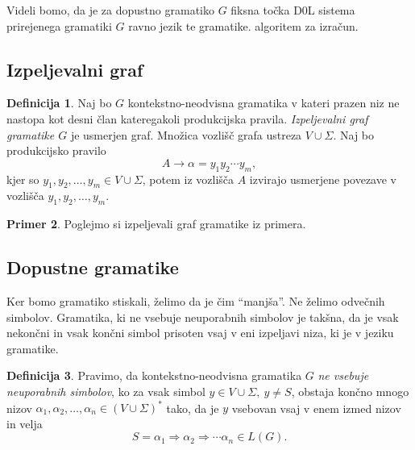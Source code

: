 \documentclass{amsart}
\theoremstyle{definition}
\newtheorem{definicija}{Definicija}[section]
\newtheorem{primer}[definicija]{Primer}
\theoremstyle{plain} %
\begin{document}
Videli bomo, da je za dopustno gramatiko $G$ fiksna točka D0L sistema prirejenega gramatiki $G$ ravno jezik te gramatike. algoritem za izračun.

\subsection{Izpeljevalni graf}

\begin{definicija}
    
    Naj bo $G$ kontekstno-neodvisna gramatika v kateri prazen niz ne nastopa kot desni član kateregakoli
    produkcijska pravila. \textit{Izpeljevalni graf gramatike $G$ } je usmerjen graf. Množica vozlišč grafa ustreza 
    $ V \cup \Sigma $. Naj bo produkcijsko pravilo
    \[    
        A \rightarrow \alpha = y_1 y_2 \cdots y_m,
    \]
    kjer so $ y_1, y_2, \ldots, y_m \in V \cup \Sigma $, potem iz vozlišča $ A $ izvirajo usmerjene povezave
    v vozlišča $ y_1, y_2, \ldots, y_m $.

\end{definicija}

\begin{primer}
    Poglejmo si izpeljevali graf gramatike iz primera.
%
\end{primer}

\subsection{Dopustne gramatike}

Ker bomo gramatiko stiskali, želimo da je čim ``manjša''. Ne želimo odvečnih simbolov. Gramatika, ki ne vsebuje neuporabnih
simbolov je takšna, da je vsak nekončni in vsak končni simbol prisoten vsaj v eni izpeljavi niza, ki je v jeziku gramatike. 

\begin{definicija}
    
    Pravimo, da kontekstno-neodvisna gramatika $G$ \textit{ne vsebuje neuporabnih simbolov}, ko za vsak simbol
    $ y \in V \cup \Sigma, \ y \neq S $, obstaja končno mnogo nizov $ \alpha_1, \alpha_2, \ldots, \alpha_n \in 
    (V \cup \Sigma)^* $ tako, da je $y$ vsebovan vsaj v enem izmed nizov in velja
    \[
        S = \alpha_1 \Rightarrow \alpha_2 \Rightarrow \cdots \alpha_n \in L(G).
    \]

\end{definicija}
\end{document}
